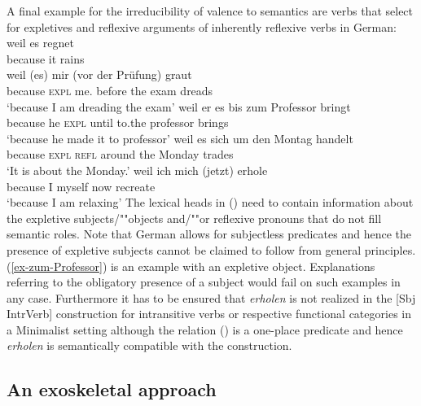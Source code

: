 \begin{exe}
\begin{xlist}[iv.]
\begin{exe}
\begin{xlist}[iv.]
A final example for the irreducibility of valence to semantics are verbs that select for expletives
and reflexive arguments of inherently reflexive verbs in German:
\eal
\ex 
\gll weil es regnet\\
     because it rains\\
\ex 
\gll weil (es) mir (vor der Prüfung) graut\\
     because \textsc{expl} me.\dat{} before the exam dreads\\
\glt `because I am dreading the exam'
\ex\label{ex-zum-Professor}
\gll weil er es bis zum Professor bringt\\
     because he \textsc{expl} until to.the professor brings\\
\glt `because he made it to professor'
\ex 
\gll weil es sich um den Montag handelt\\
     because \textsc{expl} \textsc{refl} around the Monday trades\\
\glt `It is about the Monday.'
\ex 
\gll weil ich mich (jetzt) erhole\\
     because I myself now recreate\\
\glt `because I am relaxing'
\zl
The lexical heads in () need to contain information about the expletive subjects/""objects and/""or
reflexive pronouns that do not fill semantic roles. Note that German allows for subjectless
predicates and hence the presence of expletive subjects cannot be claimed to follow from general
principles. (\ref{ex-zum-Professor}) is an example with an expletive object. Explanations referring
to the obligatory presence of a subject would fail on such examples in any case. Furthermore it has
to be ensured that \emph{erholen} is not realized in the [Sbj IntrVerb] construction for
intransitive verbs or respective functional categories in a Minimalist setting although the relation
 () is a one-place predicate and hence \emph{erholen} is
semantically compatible with the construction.  



\subsection{An exoskeletal approach}
\label{Abschnitt-Diskussion-Haugereid}


\end{xlist}
\end{exe}
\end{xlist}
\end{exe}

